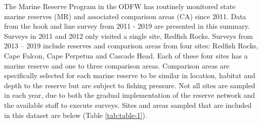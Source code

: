 \documentclass[11pt,
  english,
  a4paper,
]{article}
\begin{document}
The Marine Reserve Program in the ODFW has routinely monitored state marine reserves (MR) and associated comparison areas (CA) since 2011. Data from the hook and line survey from 2011 - 2019 are presented in this summary. Surveys in 2011 and 2012 only visited a single site, Redfish Rocks. Surveys from 2013 -- 2019 include reserves and comparison areas from four sites: Redfish Rocks, Cape Falcon, Cape Perpetua and Cascade Head. Each of these four sites has a marine reserve and one to three comparison areas. Comparison areas are specifically selected for each marine reserve to be similar in location, habitat and depth to the reserve but are subject to fishing pressure. Not all sites are sampled in each year, due to both the gradual implementation of the reserve network and the available staff to execute surveys. Sites and areas sampled that are included in this dataset are below (Table \ref{tab:table-1}).

\leavevmode\tagmcend\tagstructend\par

\begingroup\fontsize{10}{12}\selectfont
\begingroup\fontsize{10}{12}\selectfont
\end{document}
